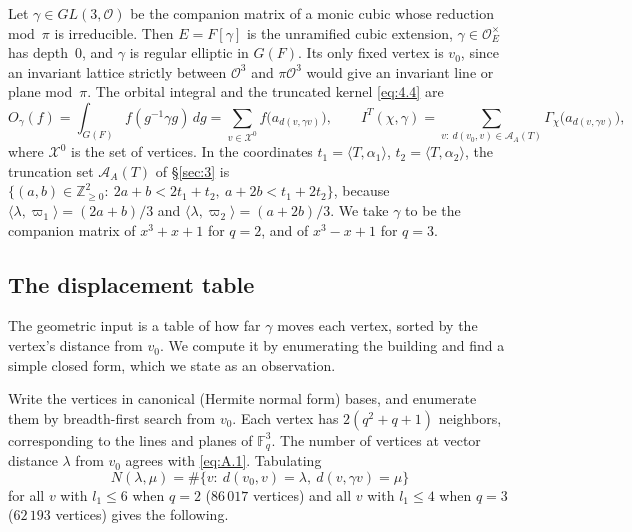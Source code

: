 \documentclass[12pt,letterpaper]{article}
\numberwithin{equation}{section}
\theoremstyle{plain}
\theoremstyle{remark}
\theoremstyle{plain}
\theoremstyle{definition}
\theoremstyle{remark}
\theoremstyle{remark}
\newcommand{\OO}{\mathcal{O}}
\newcommand{\cA}{\mathcal{A}}
\newcommand{\ip}[1]{\langle #1\rangle}
\begin{document}
Let $\gamma\in GL(3,\OO)$ be the companion matrix of a monic cubic whose reduction mod~$\pi$ is irreducible. Then $E=F[\gamma]$ is the unramified cubic extension, $\gamma\in\OO_E^\times$ has depth~$0$, and $\gamma$ is regular elliptic in $G(F)$. Its only fixed vertex is $v_0$, since an invariant lattice strictly between $\OO^3$ and $\pi\OO^3$ would give an invariant line or plane mod~$\pi$. The orbital integral and the truncated kernel \eqref{eq:4.4} are
\[
O_\gamma(f)=\int_{G(F)}f(g^{-1}\gamma g)\,dg=\sum_{v\in\mathcal X^0}f\big(a_{d(v,\gamma v)}\big),\qquad
I^T(\chi,\gamma)=\sum_{v:\ d(v_0,v)\in\cA_A(T)}\Gamma_\chi\big(a_{d(v,\gamma v)}\big),
\]
where $\mathcal X^0$ is the set of vertices. In the coordinates $t_1=\ip{T,\alpha_1}$, $t_2=\ip{T,\alpha_2}$, the truncation set $\cA_A(T)$ of \S\ref{sec:3} is $\{(a,b)\in\mathbb{Z}_{\ge0}^2:\ 2a+b<2t_1+t_2,\ a+2b<t_1+2t_2\}$, because $\ip{\lambda,\varpi_1}=(2a+b)/3$ and $\ip{\lambda,\varpi_2}=(a+2b)/3$. We take $\gamma$ to be the companion matrix of $x^3+x+1$ for $q=2$, and of $x^3-x+1$ for $q=3$.

\subsection{The displacement table}\label{sec:A.2}

The geometric input is a table of how far $\gamma$ moves each vertex, sorted by the vertex's distance from $v_0$. We compute it by enumerating the building and find a simple closed form, which we state as an observation.


Write the vertices in canonical (Hermite normal form) bases, and enumerate them by breadth-first search from $v_0$. Each vertex has $2(q^2+q+1)$ neighbors, corresponding to the lines and planes of $\mathbb{F}_q^3$. The number of vertices at vector distance $\lambda$ from $v_0$ agrees with \eqref{eq:A.1}. Tabulating
\[
N(\lambda,\mu)=\#\{v:\ d(v_0,v)=\lambda,\ d(v,\gamma v)=\mu\}
\]
for all $v$ with $l_1\le6$ when $q=2$ ($86\,017$ vertices) and all $v$ with $l_1\le4$ when $q=3$ ($62\,193$ vertices) gives the following.
\end{document}
